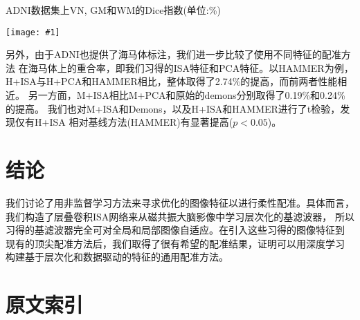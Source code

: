 \documentclass[a4paper]{article}
\newcommand{\addplot}[1]{\centering
	\texttt{[image: \#1]}}
\numberwithin{equation}{section}
\begin{document}
\begin{table}
    \centering
    \caption{ADNI数据集上VN, GM和WM的Dice指数(单位:\%)}
    \label{tab:1}
    \addplot{res/tab1.png}
\end{table}

另外，由于ADNI也提供了海马体标注，我们进一步比较了使用不同特征的配准方法
在海马体上的重合率，即我们习得的ISA特征和PCA特征。以HAMMER为例，
H+ISA与H+PCA和HAMMER相比，整体取得了2.74\%的提高，而前两者性能相近。
另一方面，M+ISA相比M+PCA和原始的demons分别取得了0.19\%和0.24\%的提高。
我们也对M+ISA和Demons，以及H+ISA和HAMMER进行了t检验，发现仅有H+ISA
相对基线方法(HAMMER)有显著提高($p<0.05$)。

\section{结论}
我们讨论了用非监督学习方法来寻求优化的图像特征以进行柔性配准。具体而言，
我们构造了层叠卷积ISA网络来从磁共振大脑影像中学习层次化的基滤波器，
所以习得的基滤波器完全可对全局和局部图像自适应。在引入这些习得的图像特征到
现有的顶尖配准方法后，我们取得了很有希望的配准结果，证明可以用深度学习
构建基于层次化和数据驱动的特征的通用配准方法。

\printbibliography[notcategory=fullcited]

\section*{原文索引}
\end{document}

